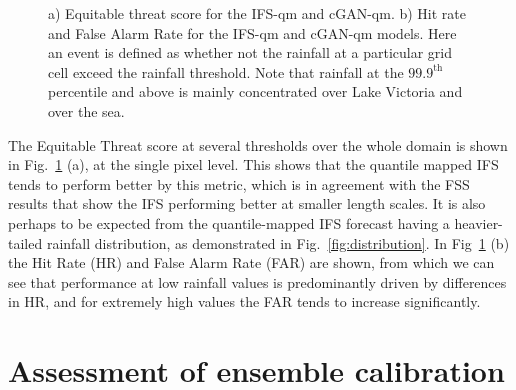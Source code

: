 \documentclass[../main.tex]{subfiles}
\begin{document}
\begin{figure}[ht]
\begin{subfigure}[t]{0.49\textwidth}
     \caption{}
     \end{subfigure}
     \caption{ a) Equitable threat score for the IFS-qm and cGAN-qm. b) Hit rate and False Alarm Rate for the IFS-qm and cGAN-qm models. Here an event is defined as whether not the rainfall at a particular grid cell exceed the rainfall threshold. Note that rainfall at the $99.9^{\text{th}}$ percentile and above is mainly concentrated over Lake Victoria and over the sea.}
     \label{fig:ets}
\end{figure}


The Equitable Threat score at several thresholds over the whole domain is shown in Fig.~\ref{fig:ets} (a), at the single pixel level. This shows that the quantile mapped IFS tends to perform better by this metric, which is in agreement with the FSS results that show the IFS performing better at smaller length scales. It is also perhaps to be expected from the quantile-mapped IFS forecast having a heavier-tailed rainfall distribution, as demonstrated in Fig.~\ref{fig:distribution}. In Fig~\ref{fig:ets} (b) the Hit Rate (HR) and False Alarm Rate (FAR) are shown, from which we can see that performance at low rainfall values is predominantly driven by differences in HR, and for extremely high values the FAR tends to increase significantly.







        
\section{Assessment of ensemble calibration}
\end{document}
